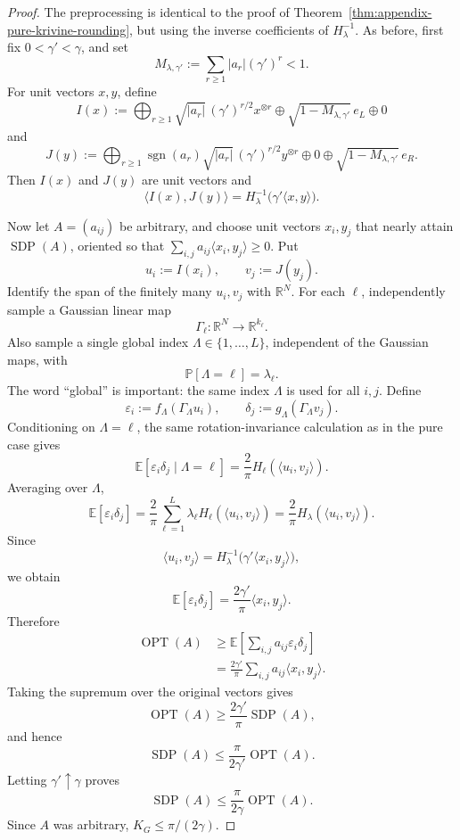 \begin{proof}
The preprocessing is identical to the proof of
Theorem~\ref{thm:appendix-pure-krivine-rounding}, but using the inverse
coefficients of \(H_\lambda^{-1}\). As before, first fix
\(0<\gamma'<\gamma\), and set
\[
    M_{\lambda,\gamma'}
    :=
    \sum_{r\ge 1}|a_r|(\gamma')^r
    <1.
\]
For unit vectors \(x,y\), define
\[
    I(x)
    :=
    \bigoplus_{r\ge 1}
        \sqrt{|a_r|}\,(\gamma')^{r/2}x^{\otimes r}
    \oplus \sqrt{1-M_{\lambda,\gamma'}}\,e_L
    \oplus 0
\]
and
\[
    J(y)
    :=
    \bigoplus_{r\ge 1}
        \operatorname{sgn}(a_r)\sqrt{|a_r|}\,(\gamma')^{r/2}y^{\otimes r}
    \oplus 0
    \oplus \sqrt{1-M_{\lambda,\gamma'}}\,e_R.
\]
Then \(I(x)\) and \(J(y)\) are unit vectors and
\[
    \langle I(x),J(y)\rangle
    =
    H_\lambda^{-1}\bigl(\gamma'\langle x,y\rangle\bigr).
\]

Now let \(A=(a_{ij})\) be arbitrary, and choose unit vectors
\(x_i,y_j\) that nearly attain \(\operatorname{SDP}(A)\), oriented so that
\(\sum_{i,j}a_{ij}\langle x_i,y_j\rangle\ge 0\). Put
\[
    u_i:=I(x_i),
    \qquad
    v_j:=J(y_j).
\]
Identify the span of the finitely many \(u_i,v_j\) with \(\mathbb R^N\).
For each \(\ell\), independently sample a Gaussian linear map
\[
    \Gamma_\ell:\mathbb R^N\to\mathbb R^{k_\ell}.
\]
Also sample a single global index \(\Lambda\in\{1,\ldots,L\}\), independent
of the Gaussian maps, with
\[
    \mathbb P[\Lambda=\ell]=\lambda_\ell.
\]
The word ``global'' is important: the same index \(\Lambda\) is used for
all \(i,j\). Define
\[
    \varepsilon_i
    :=
    f_\Lambda\left(\Gamma_\Lambda u_i\right),
    \qquad
    \delta_j
    :=
    g_\Lambda\left(\Gamma_\Lambda v_j\right).
\]
Conditioning on \(\Lambda=\ell\), the same rotation-invariance calculation
as in the pure case gives
\[
    \mathbb E[\varepsilon_i\delta_j\mid \Lambda=\ell]
    =
    \frac{2}{\pi}H_\ell(\langle u_i,v_j\rangle).
\]
Averaging over \(\Lambda\),
\[
    \mathbb E[\varepsilon_i\delta_j]
    =
    \frac{2}{\pi}
    \sum_{\ell=1}^L\lambda_\ell H_\ell(\langle u_i,v_j\rangle)
    =
    \frac{2}{\pi}H_\lambda(\langle u_i,v_j\rangle).
\]
Since
\[
    \langle u_i,v_j\rangle
    =
    H_\lambda^{-1}\bigl(\gamma'\langle x_i,y_j\rangle\bigr),
\]
we obtain
\[
    \mathbb E[\varepsilon_i\delta_j]
    =
    \frac{2\gamma'}{\pi}\langle x_i,y_j\rangle.
\]
Therefore
\[
\begin{aligned}
    \operatorname{OPT}(A)
    &\ge
    \mathbb E\left[
        \sum_{i,j}a_{ij}\varepsilon_i\delta_j
    \right] \\
    &=
    \frac{2\gamma'}{\pi}
    \sum_{i,j}a_{ij}\langle x_i,y_j\rangle.
\end{aligned}
\]
Taking the supremum over the original vectors gives
\[
    \operatorname{OPT}(A)
    \ge
    \frac{2\gamma'}{\pi}\operatorname{SDP}(A),
\]
and hence
\[
    \operatorname{SDP}(A)
    \le
    \frac{\pi}{2\gamma'}\operatorname{OPT}(A).
\]
Letting \(\gamma'\uparrow\gamma\) proves
\[
    \operatorname{SDP}(A)
    \le
    \frac{\pi}{2\gamma}\operatorname{OPT}(A).
\]
Since \(A\) was arbitrary, \(K_G\le \pi/(2\gamma)\).
\end{proof}

